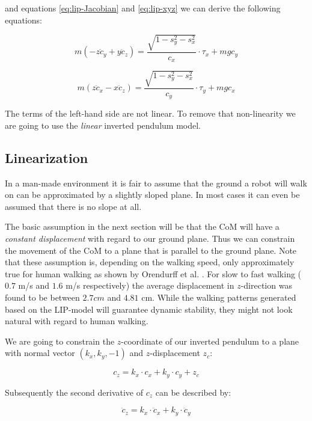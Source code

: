 \documentclass[english,ngerman]{KITreprt}
\begin{document}
and equations \ref{eq:lip-Jacobian} and \ref{eq:lip-xyz} we can derive
the following equations:

\begin{equation} \label{eq:lip-dyn-y}
m(-z\ddot{c}_y + y\ddot{c}_z) = \frac{\sqrt{1 - s_y^2 - s_x^2}}{c_x} \cdot \tau_x + m g c_y
\end{equation}

\begin{equation} \label{eq:lip-dyn-x}
m(z\ddot{c}_x - x\ddot{c}_z) = \frac{\sqrt{1 - s_y^2 - s_x^2}}{c_y} \cdot \tau_y + m g c_x
\end{equation}

The terms of the left-hand side are not linear. To remove that
non-linearity we are going to use the \emph{linear} inverted pendulum
model.

\subsection{Linearization}\label{linearization}

In a man-made environment it is fair to assume that the ground a robot
will walk on can be approximated by a slightly sloped plane. In most
cases it can even be assumed that there is no slope at all.

The basic assumption in the next section will be that the CoM will have
a \emph{constant displacement} with regard to our ground plane. Thus we
can constrain the movement of the CoM to a plane that is parallel to the
ground plane. Note that these assumption is, depending on the walking
speed, only approximately true for human walking as shown by Orendurff
et al. \citep{orendurff2004effect}. For slow to fast walking ($0.7$ m/s
and $1.6$ m/s respectively) the average displacement in $z$-direction
was found to be between $2.7cm$ and $4.81$ cm. While the walking
patterns generated based on the LIP-model will guarantee dynamic
stability, they might not look natural with regard to human walking.

We are going to constrain the $z$-coordinate of our inverted pendulum to
a plane with normal vector $(k_x, k_y, -1)$ and $z$-displacement $z_c$:

\begin{equation} \label{eq:lip-z-plane}
c_z = k_x \cdot c_x + k_y \cdot c_y + z_c
\end{equation}

Subsequently the second derivative of $c_z$ can be described by:

\begin{equation} \label{eq:lip-z-div}
\ddot{c}_z = k_x \cdot \ddot{c}_x + k_y \cdot \ddot{c}_y
\end{equation}
\end{document}

